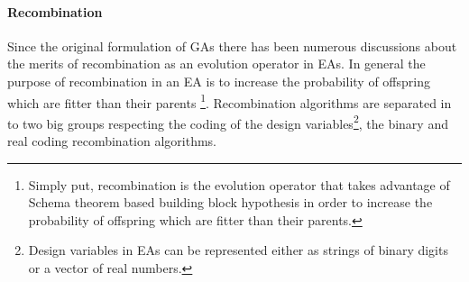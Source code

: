 \paragraph{Recombination}
Since the original formulation of GAs \cite{holland_1975} there has been numerous discussions about the merits of recombination as an evolution operator in EAs. In general the purpose of recombination in an EA is to increase the probability of offspring which are fitter than their parents \footnote{Simply put, recombination is the evolution operator that takes advantage of Schema theorem based building block hypothesis in order to increase the probability of offspring which are fitter than their parents.}. Recombination algorithms are separated in to two big groups respecting the coding of the design variables\footnote{Design variables in EAs can be represented either as strings of binary digits or a vector of real numbers.}, the binary and real coding recombination algorithms. 

